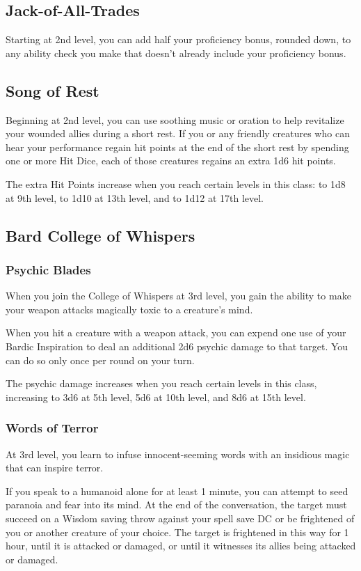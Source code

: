 \documentclass[letterpaper,openany,oneside,twocolumn]{book}
\begin{document}
\subsection*{Jack-of-All-Trades}
Starting at 2nd level, you can add half your proficiency bonus, rounded down, to any ability check you make that doesn't already include your proficiency bonus.
\subsection*{Song of Rest}
Beginning at 2nd level, you can use soothing music or oration to help revitalize your wounded allies during a short rest. If you or any friendly creatures who can hear your performance regain hit points at the end of the short rest by spending one or more Hit Dice, each of those creatures regains an extra 1d6 hit points.

The extra Hit Points increase when you reach certain levels in this class: to 1d8 at 9th level, to 1d10 at 13th level, and to 1d12 at 17th level.
\subsection*{Bard College of Whispers}
\subsubsection*{Psychic Blades}
When you join the College of Whispers at 3rd level, you gain the ability to make your weapon attacks magically toxic to a creature's mind.

When you hit a creature with a weapon attack, you can expend one use of your Bardic Inspiration to deal an additional 2d6 psychic damage to that target. You can do so only once per round on your turn.

The psychic damage increases when you reach certain levels in this class, increasing to 3d6 at 5th level, 5d6 at 10th level, and 8d6 at 15th level.

\subsubsection*{Words of Terror}
At 3rd level, you learn to infuse innocent-seeming words with an insidious magic that can inspire terror.

If you speak to a humanoid alone for at least 1 minute, you can attempt to seed paranoia and fear into its mind. At the end of the conversation, the target must succeed on a Wisdom saving throw against your spell save DC or be frightened of you or another creature of your choice. The target is frightened in this way for 1 hour, until it is attacked or damaged, or until it witnesses its allies being attacked or damaged.
\end{document}
